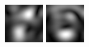 \begin{figure}[ht]
\begin{center}
 \includegraphics[width=\columnwidth/9]{ch4/figures/mag_2_3.jpg}
 \includegraphics[width=\columnwidth/9]{ch4/figures/mag_2_4.jpg}

\end{center}
\end{figure}
